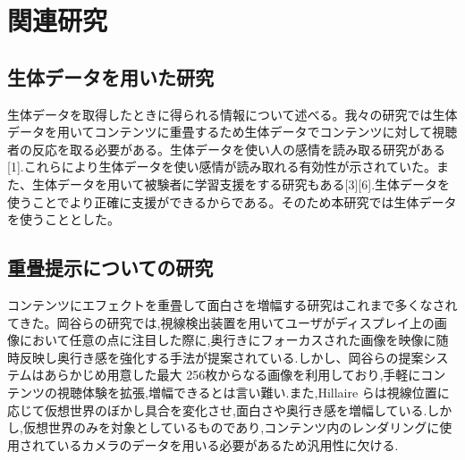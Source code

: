 \thispagestyle{myheadings}
\chapter{関連研究}


\section{生体データを用いた研究}
生体データを取得したときに得られる情報について述べる。我々の研究では生体データを用いてコンテンツに重畳するため生体データでコンテンツに対して視聴者の反応を取る必要がある。生体データを使い人の感情を読み取る研究がある[1].これらにより生体データを使い感情が読み取れる有効性が示されていた。また、生体データを用いて被験者に学習支援をする研究もある[3][6].生体データを使うことでより正確に支援ができるからである。そのため本研究では生体データを使うこととした。


\section{重畳提示についての研究}
コンテンツにエフェクトを重畳して面白さを増幅する研究はこれまで多くなされてきた。岡谷ら\cite{effects01}の研究では,視線検出装置を用いてユーザがディスプレイ上の画像において任意の点に注目した際に,奥行きにフォーカスされた画像を映像に随時反映し奥行き感を強化する手法が提案されている.しかし、岡谷らの提案システムはあらかじめ用意した最大 256枚からなる画像を利用しており,手軽にコンテンツの視聴体験を拡張,増幅できるとは言い難い.また,Hillaire らは視線位置に応じて仮想世界のぼかし具合を変化させ,面白さや奥行き感を増幅している.しかし,仮想世界のみを対象としているものであり,コンテンツ内のレンダリングに使用されているカメラのデータを用いる必要があるため汎用性に欠ける.


